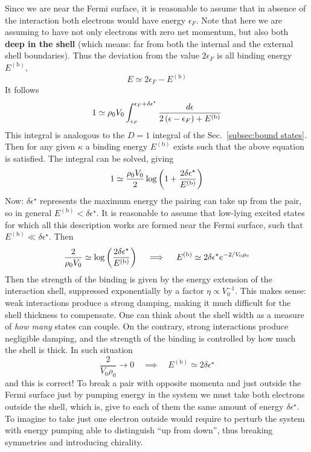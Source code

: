 Since we are near the Fermi surface, it is reasonable to assume that in absence of the interaction both electrons would have energy $\epsilon_F$. Note that here we are assuming to have not only electrons with zero net momentum, but also both \textbf{deep in the shell} (which means: far from both the internal and the external shell boundaries). Thus the deviation from the value $2\epsilon_F$ is all binding energy $E^{(\mathrm{b})}$,
\[
	E \simeq 2 \epsilon_F - E^{(\mathrm{b})}
\]
It follows
\[
	1 \simeq \rho_0 V_0 \int_{\epsilon_F}^{\epsilon_F+\delta\epsilon^\star} \frac{d\epsilon}{2\left({\epsilon-\epsilon_F}\right) + E^{(\mathrm{b})}}
\]
This integral is analogous to the $D=1$ integral of the Sec.~\ref{subsec:bound states}. Then for any given $\kappa$ a binding energy $E^{(\mathrm{b})}$ exists such that the above equation is satisfied. The integral can be solved, giving
\[
	1 \simeq \frac{\rho_0 V_0}{2} \log \left({1+ \frac{2\delta\epsilon^\star}{E^{(\mathrm{b})}}}\right)
\]
Now: $\delta\epsilon^\star$ represents the maximum energy the pairing can take up from the pair, so in general $E^{(\mathrm{b})} < \delta\epsilon^\star$. It is reasonable to assume that low-lying excited states for which all this description works are formed near the Fermi surface, such that $E^{(\mathrm{b})} \ll \delta\epsilon^\star$. Then
\[
	\frac{2}{\rho_0 V_0} \simeq \log \left({\frac{2\delta\epsilon^\star}{E^{(\mathrm{b})}}}\right)
	\quad\implies\quad
	E^{(\mathrm{b})} \simeq 2\delta\epsilon^\star e^{-2/V_0 \rho_0}
\]
Then the strength of the binding is given by the energy extension of the interaction shell, suppressed exponentially by a factor $\eta \propto V_0^{-1}$. This makes sense: weak interactions produce a strong damping, making it much difficult for the shell thickness to compensate. One can think about the shell width as a measure of \textit{how many} states can couple. On the contrary, strong interactions produce negligible damping, and the strength of the binding is controlled by how much the shell is thick.
In such situation
\[
	\frac{2}{V_0 \rho_0} \to 0
	\quad\implies\quad
	E^{(\mathrm{b})} \simeq 2\delta\epsilon^\star
\]
and this is correct! To break a pair with opposite momenta and just outside the Fermi surface just by pumping energy in the system we must take both electrons outside the shell, which is, give to each of them the same amount of energy $\delta\epsilon^\star$. To imagine to take just one electron outside would require to perturb the system with energy pumping able to distinguish ``up from down'', thus breaking symmetries and introducing chirality.

